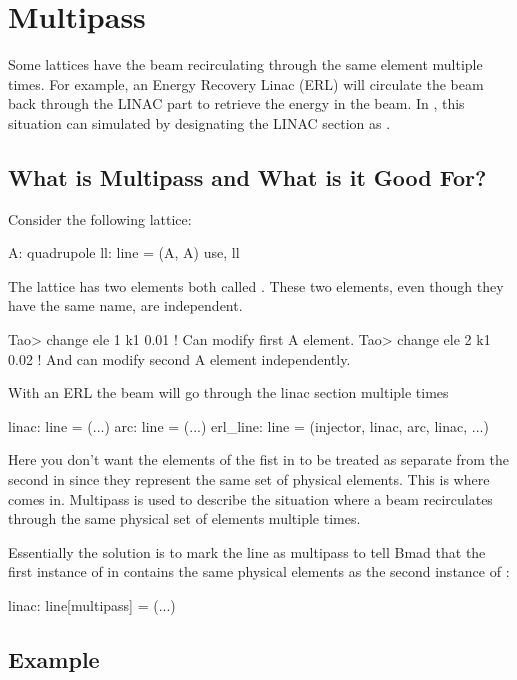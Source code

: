 \documentclass{hitec}
\newcommand{\Section}[1]{\section{#1}\vspace*{-1ex}}
\begin{document}
\Section{Multipass}

Some lattices have the beam recirculating through the same element multiple times. For example, an
Energy Recovery Linac (ERL) will circulate the beam back through the LINAC part to retrieve the
energy in the beam. In \bmad, this situation can simulated by designating the LINAC section as . 

\subsection{What is Multipass and What is it Good For?}

Consider the following lattice:
\begin{code}
A: quadrupole
ll: line = (A, A)
use, ll
\end{code}
The lattice has two elements both called . These two elements, even though they have the same name, are independent.
\begin{code}
Tao> change ele 1 k1 0.01   ! Can modify first A element.
Tao> change ele 2 k1 0.02   ! And can modify second A element independently.
\end{code}
With an ERL the beam will go through the linac section multiple times
\begin{code}
linac: line = (...)
arc: line = (...)
erl_line: line = (injector, linac, arc, linac, ...)
\end{code}
Here you don't want the elements of the fist  in  to be treated as separate
from the second  in  since they represent the same set of physical elements.
This is where  comes in.  Multipass is used to describe the situation where a beam
recirculates through the same physical set of elements multiple times.

Essentially the solution is to mark the  line as multipass to tell Bmad that the first instance of  in 
contains the same physical elements as the second instance of :
\begin{code}
linac: line[multipass] = (...)
\end{code}

\subsection{Example}
\end{document}
